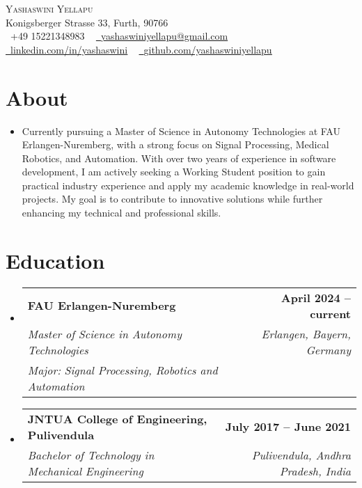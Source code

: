 \documentclass[letterpaper,11pt]{article}
\makeatletter
\newcommand{\resumeItem}[1]{
  \item\small{
    {#1 \vspace{-2pt}}
  }
}
\newcommand{\resumeSubheading}[4]{
  \vspace{-2pt}\item
    \begin{tabular*}{1.0\textwidth}[t]{l@{\extracolsep{\fill}}r}
      \textbf{#1} & \textbf{\small #2} \\
      \textit{\small#3} & \textit{\small #4} \\
    \end{tabular*}\vspace{-7pt}
}
\newcommand{\education}[6]{
  \vspace{-2pt}\item
    \begin{tabular*}{1.0\textwidth}[t]{l@{\extracolsep{\fill}}r}
      \textbf{#1} & \textbf{\small #2} \\
      \textit{\small#3} & \textit{\small#4} \\
      \textit{\small#5} \textit{\small#6}
    \end{tabular*}\vspace{-7pt}
}
\newcommand{\resumeSubHeadingListStart}{\begin{itemize}[leftmargin=0.0in, label={}]}
\newcommand{\resumeSubHeadingListEnd}{\end{itemize}}
\makeatother
\begin{document}
\begin{center}
  {\Huge \scshape Yashaswini Yellapu} \\ \vspace{1pt}
  Konigsberger Strasse 33, Furth, 90766 \\ \vspace{1pt}
  \small \raisebox{-0.1\height}\faPhone\ +49 15221348983 ~ \href{mailto:yashaswiniyellapu@gmail.com}{\raisebox{-0.2\height}\faEnvelope\  \underline{yashaswiniyellapu@gmail.com}} ~
  \href{https://www.linkedin.com/in/yashaswini-y-200500149/}{\raisebox{-0.2\height}\faLinkedin\ \underline{linkedin.com/in/yashaswini}}  ~
  \href{https://github.com/yashaswiniyellapu}{\raisebox{-0.2\height}\faGithub\ \underline{github.com/yashaswiniyellapu}}
  \vspace{-8pt}
\end{center}

\section{About}
\begin{justify}
  \resumeSubHeadingListStart
  \resumeItem{Currently pursuing a Master of Science in Autonomy Technologies at FAU Erlangen-Nuremberg, with a strong focus on Signal Processing, Medical Robotics, and Automation. With over two years of experience in software development, I am actively seeking a Working Student position to gain practical industry experience and apply my academic knowledge in real-world projects. My goal is to contribute to innovative solutions while further enhancing my technical and professional skills.}
  \resumeSubHeadingListEnd
\end{justify}

\vspace{-16pt}

\section{Education}
\resumeSubHeadingListStart
\education
{FAU Erlangen-Nuremberg}{April 2024 -- current}
{Master of Science in Autonomy Technologies}{Erlangen, Bayern, Germany}
{Major:} {Signal Processing, Robotics and Automation}
\resumeSubheading
{JNTUA College of Engineering, Pulivendula}{July 2017 -- June 2021}
{Bachelor of Technology in Mechanical Engineering}{Pulivendula, Andhra Pradesh, India}
\resumeSubHeadingListEnd

\end{document}
